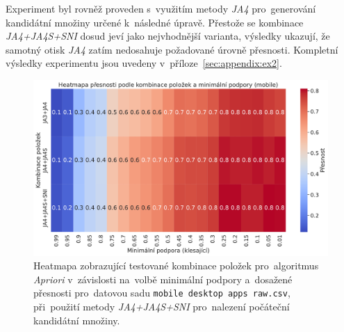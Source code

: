 Experiment byl rovněž proveden s~využitím metody \textit{JA4} pro~generování kandidátní množiny určené k~následné úpravě. Přestože se kombinace \textit{JA4+JA4S+SNI} dosud jeví jako nejvhodnější varianta, výsledky ukazují, že samotný otisk \textit{JA4} zatím nedosahuje požadované úrovně přesnosti. Kompletní výsledky experimentu jsou uvedeny v~příloze~\ref{sec:appendix:ex2}.

\begin{figure}[H]
	\centering
	\includegraphics[width=\textwidth]{obrazky-figures/exps/ex2-mobile-heatmap.pdf}
	\caption{Heatmapa zobrazující testované kombinace položek pro~algoritmus \textit{Apriori} v~závislosti na~volbě minimální podpory a~dosažené přesnosti pro~datovou sadu \texttt{mobile desktop apps raw.csv}, při~použití metody \textit{JA4+JA4S+SNI} pro~nalezení počáteční kandidátní množiny.}
	\label{fig:ex2-mobile-heatmap}
\end{figure}

